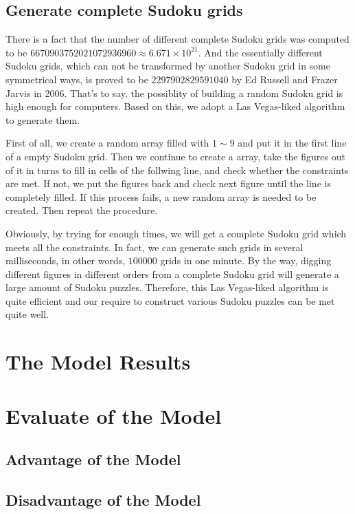 \documentclass{mcmthesis}
\begin{document}
\subsection{Generate complete Sudoku grids}
\indent There is a fact that the number of different complete Sudoku grids was computed to be $6670903752021072936960 \approx 6.671 \times 10^{21}$. And the essentially different Sudoku grids, which can not be transformed by another Sudoku grid in some symmetrical ways, is proved to be $2297902829591040$ by Ed Russell and Frazer Jarvis in 2006. That's to say, the possiblity of building a random Sudoku grid is high enough for computers. Based on this, we adopt a Las Vegas-liked algorithm to generate them.\par
\indent First of all, we create a random array filled with $1\sim9$ and put it in the first line of a empty Sudoku grid. Then we continue to create a array, take the figures out of it in turns to fill in cells of the follwing line, and check  whether the constraints are met. If not, we put the figures back and check next figure until the line is completely filled. If this process fails, a new random array is needed to be created. Then repeat the procedure. \par
\indent Obviously, by trying for enough times, we will get a complete Sudoku grid which meets all the constraints. In fact, we can generate such grids in several milliseconds, in other words, $100000$ grids in one minute. By the way, digging different figures in different orders from a complete Sudoku grid will generate a large amount of Sudoku puzzles. Therefore, this Las Vegas-liked algorithm is quite efficient and our require to construct various Sudoku puzzles can be met quite well.

\section{The Model Results}


\section{Evaluate of the Model}
\subsection{Advantage of the Model}
\subsection{Disadvantage of the Model}
\end{document}
